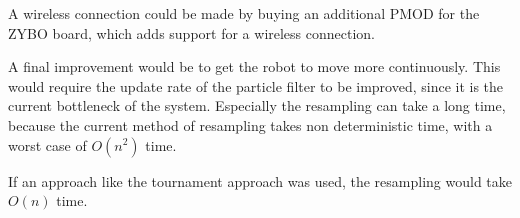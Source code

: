 \documentclass[Main]{subfiles}
\begin{document}
	A wireless connection could be made by buying an additional PMOD for the ZYBO board, which adds support for a wireless connection.
	
	A final improvement would be to get the robot to move more continuously. 
	This would require the update rate of the particle filter to be improved, since it is the current bottleneck of the system.
	Especially the resampling can take a long time, because the current method of resampling takes non deterministic time, with a worst case of $O(n^2)$ time.
	
	If an approach like the tournament approach was used, the resampling would take $O(n)$ time.
\end{document}
